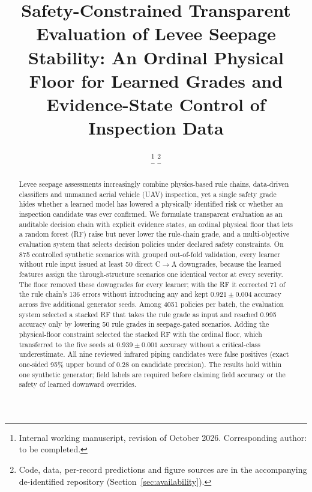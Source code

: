 \documentclass[journal]{IEEEtran}
\begin{document}
\title{Safety-Constrained Transparent Evaluation of Levee Seepage Stability: An Ordinal Physical Floor for Learned Grades and Evidence-State Control of Inspection Data}

\author{%
\thanks{Internal working manuscript, revision of October 2026. Corresponding author: to be completed.}%
\thanks{Code, data, per-record predictions and figure sources are in the accompanying de-identified repository (Section~\ref{sec:availability}).}}

\maketitle

\begin{abstract}
Levee seepage assessments increasingly combine physics-based rule chains, data-driven classifiers and unmanned aerial vehicle (UAV) inspection, yet a single safety grade hides whether a learned model has lowered a physically identified risk or whether an inspection candidate was ever confirmed. We formulate transparent evaluation as an auditable decision chain with explicit evidence states, an ordinal physical floor that lets a random forest (RF) raise but never lower the rule-chain grade, and a multi-objective evaluation system that selects decision policies under declared safety constraints. On 875 controlled synthetic scenarios with grouped out-of-fold validation, every learner without rule input issued at least 50 direct C$\rightarrow$A downgrades, because the learned features assign the through-structure scenarios one identical vector at every severity. The floor removed these downgrades for every learner; with the RF it corrected 71 of the rule chain's 136 errors without introducing any and kept $0.921\pm0.004$ accuracy across five additional generator seeds. Among 4051 policies per batch, the evaluation system selected a stacked RF that takes the rule grade as input and reached 0.995 accuracy only by lowering 50 rule grades in seepage-gated scenarios. Adding the physical-floor constraint selected the stacked RF with the ordinal floor, which transferred to the five seeds at $0.939\pm0.001$ accuracy without a critical-class underestimate. All nine reviewed infrared piping candidates were false positives (exact one-sided 95\% upper bound of 0.28 on candidate precision). The results hold within one synthetic generator; field labels are required before claiming field accuracy or the safety of learned downward overrides.
\end{abstract}
\end{document}

